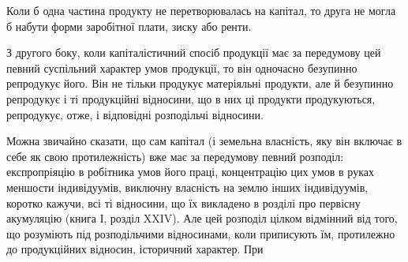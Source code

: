 Коли б одна частина продукту не перетворювалась на капітал, то друга
не могла б набути форми заробітної плати, зиску або ренти.

З другого боку, коли капіталістичний спосіб продукції має за передумову цей
певний суспільний характер умов продукції, то він одночасно безупинно репродукує
його. Він не тільки продукує матеріяльні продукти, але й безупинно репродукує
і ті продукційні відносини, що в них ці продукти продукуються,
репродукує, отже, і відповідні розподільчі відносини.

Можна звичайно сказати, що сам капітал (і земельна власність, яку
він включає в себе як свою протилежність) вже має за передумову певний
розподіл: експропріяцію в робітника умов його праці, концентрацію
цих умов в руках меншости індивідуумів, виключну власність на землю
інших індивідуумів, коротко кажучи, всі ті відносини, що їх викладено в розділі
про первісну акумуляцію (книга І, розділ XXIV). Але цей розподіл цілком
відмінний від того, що розуміють під розподільчими відносинами, коли приписують
їм, протилежно до продукційних відносин, історичний характер. При
\parbreak{}  %
